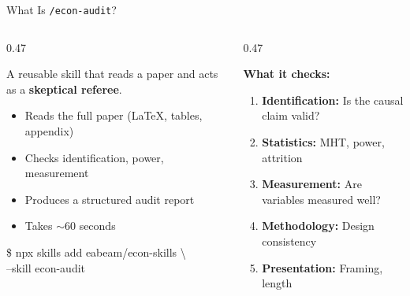 \documentclass[aspectratio=169, 10pt]{beamer}
\begin{document}
\begin{frame}[fragile]{What Is \texttt{/econ-audit}?}
\vskip-2pt
\begin{columns}[T]
\begin{column}{0.47\textwidth}
\begin{tcolorbox}[keybox, title={\faSearch\quad An Adversarial Review Skill}, top=3pt, bottom=3pt]
\small
A reusable skill that reads a paper and acts as a \textbf{skeptical referee}.
\vskip3pt
\begin{itemize}\setlength{\itemsep}{1pt}
  \item Reads the full paper (LaTeX, tables, appendix)
  \item Checks identification, power, measurement
  \item Produces a structured audit report
  \item Takes $\sim$60 seconds
\end{itemize}
\end{tcolorbox}
\vskip3pt
\begin{tcolorbox}[colback=DarkSlate, colframe=DarkSlate, arc=2pt,
  left=4pt, right=4pt, top=2pt, bottom=2pt]
{\color{CoolGray}\ttfamily\scriptsize \$ npx skills add eabeam/econ-skills \textbackslash\\
\quad\quad --skill econ-audit}
\end{tcolorbox}
\end{column}
\begin{column}{0.47\textwidth}
\begin{tcolorbox}[accentbox, top=3pt, bottom=3pt]
\small
\textbf{What it checks:}
\vskip3pt
\begin{enumerate}\setlength{\itemsep}{1pt}
  \item \textbf{Identification:} Is the causal claim valid?
  \item \textbf{Statistics:} MHT, power, attrition
  \item \textbf{Measurement:} Are variables measured well?
  \item \textbf{Methodology:} Design consistency
  \item \textbf{Presentation:} Framing, length
\end{enumerate}
\end{tcolorbox}
\end{column}
\end{columns}
\end{frame}
\end{document}
